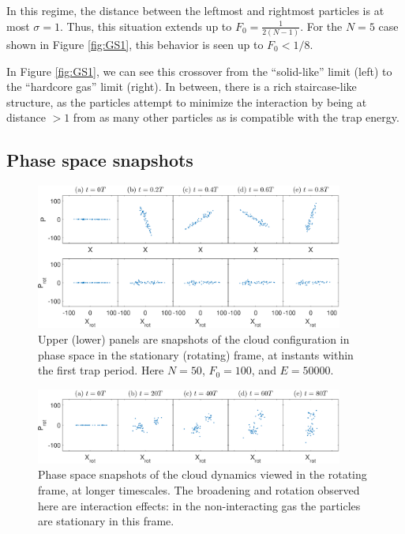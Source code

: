 \documentclass[aps,preprintnumbers,onecolumn,amsmath,amssymb,floatfix,pra]{revtex4-1}
\begin{document}
In this regime, the distance between the leftmost and rightmost particles is at most $\sigma=1$.
Thus, this situation extends up to $F_0 = \frac{1}{2(N-1)}$.  For the $N=5$ case shown in Figure
\ref{fig:GS1}, this behavior is seen up to $F_0 < 1/8$.


In Figure \ref{fig:GS1}, we can see this crossover from the ``solid-like'' limit (left) to the
``hardcore gas'' limit (right).  In between, there is a rich staircase-like structure, as the
particles attempt to minimize the interaction by being at distance $>1$ from as many other particles
as is compatible with the trap energy.


\subsection{Phase space snapshots}


\begin{figure}[h]
\includegraphics[width=0.9\textwidth]{ZhiyuPictures/stationary_and_rotating_frame_t=1-5_5T.eps}
%
\caption{Upper (lower) panels are snapshots of the cloud configuration in phase space in the
  stationary (rotating) frame, at instants within the first trap period.  Here $N=50$, $F_0=100$,
  and $E=50000$.  }
\label{fig:Breathingfrequency2_0}
\end{figure}


\begin{figure}
\includegraphics[width=0.9\textwidth]{ZhiyuPictures/rotating_frame_t=0-80T.eps}  
\caption{Phase space snapshots of the cloud dynamics viewed in the rotating frame, at longer
  timescales.  The broadening and rotation observed here are interaction effects: in the
  non-interacting gas the particles are stationary in this frame.}
\label{fig:Breathingfrequency2_1}
\end{figure}
\end{document}

